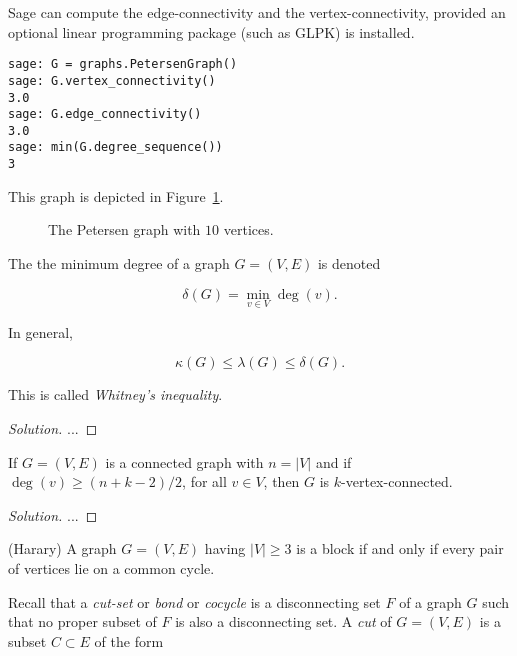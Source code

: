 \begin{example}
{\rm
Sage can compute the edge-connectivity and the vertex-connectivity,
provided an optional linear programming package
(such as GLPK) is installed.

\begin{lstlisting}
sage: G = graphs.PetersenGraph()
sage: G.vertex_connectivity()
3.0
sage: G.edge_connectivity()
3.0
sage: min(G.degree_sequence())
3
\end{lstlisting}
%
This graph is depicted in Figure~\ref{fig:distance_connectivity:petersen_graph}.

\begin{figure}[!htbp]
\centering

\caption{The Petersen graph with $10$ vertices.}
\label{fig:distance_connectivity:petersen_graph}
\end{figure}
}
\end{example}
The the minimum degree of a graph $G=(V,E)$ is
denoted

\[
\delta(G) = \min_{v\in V} \deg(v).
\]

\begin{proposition}
{\rm
In general,

\[
\kappa(G)\leq \lambda(G)\leq \delta(G).
\]
}
\end{proposition}

This is called {\it Whitney's inequality}.

\begin{proof}[Solution]

...

\end{proof}

\begin{theorem}
{\rm
If $G=(V,E)$ is a connected graph with $n=|V|$ and if
$\deg(v)\geq (n+k-2)/2$, for all $v\in V$, then
$G$ is $k$-vertex-connected.
}
\end{theorem}

\begin{proof}[Solution]

...

\end{proof}


\begin{corollary} (Harary)
{\rm
A graph $G=(V,E)$ having $|V|\geq 3$ is a block if and only if
every pair of vertices lie on a common
cycle.
}
\end{corollary}


Recall that a {\it cut-set} or {\it bond}
or {\it cocycle} is a disconnecting set $F$ of a graph $G$ such that
no proper subset of $F$ is also a disconnecting set.
A {\it cut} of $G=(V,E)$ is a subset $C\subset E$ of the form

